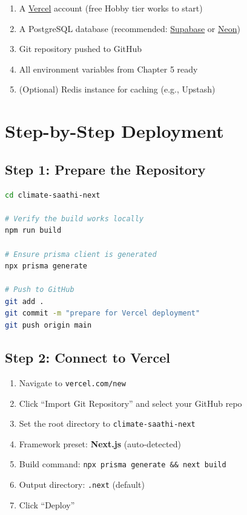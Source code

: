 \documentclass[12pt,a4paper]{report}
\begin{document}
\begin{enumerate}
  \item A \href{https://vercel.com}{Vercel} account (free Hobby tier works to start)
  \item A PostgreSQL database (recommended: \href{https://supabase.com}{Supabase} or \href{https://neon.tech}{Neon})
  \item Git repository pushed to GitHub
  \item All environment variables from Chapter 5 ready
  \item (Optional) Redis instance for caching (e.g., Upstash)
\end{enumerate}

\section{Step-by-Step Deployment}

\subsection{Step 1: Prepare the Repository}

\begin{lstlisting}[language=bash, caption={Local verification before deploy}]
cd climate-saathi-next

# Verify the build works locally
npm run build

# Ensure prisma client is generated
npx prisma generate

# Push to GitHub
git add .
git commit -m "prepare for Vercel deployment"
git push origin main
\end{lstlisting}

\subsection{Step 2: Connect to Vercel}

\begin{enumerate}
  \item Navigate to \texttt{vercel.com/new}
  \item Click ``Import Git Repository'' and select your GitHub repo
  \item Set the root directory to \texttt{climate-saathi-next}
  \item Framework preset: \textbf{Next.js} (auto-detected)
  \item Build command: \texttt{npx prisma generate \&\& next build}
  \item Output directory: \texttt{.next} (default)
  \item Click ``Deploy''
\end{enumerate}
\end{document}
